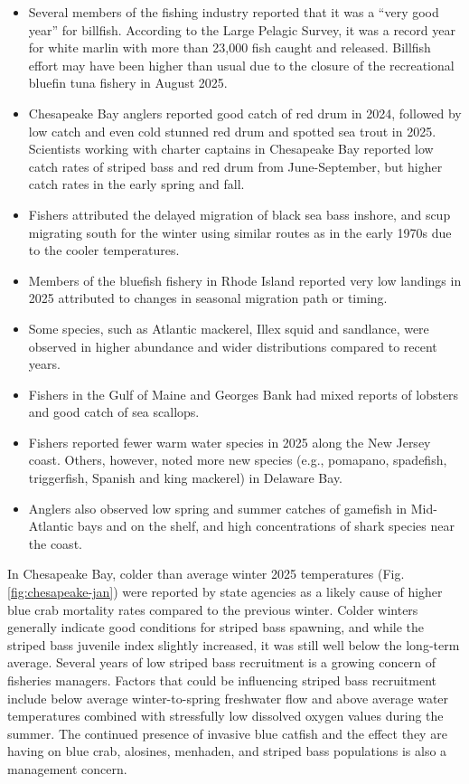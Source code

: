 \documentclass[
  10pt,
]{article}
\providecommand{\tightlist}{%
  \setlength{\itemsep}{0pt}\setlength{\parskip}{0pt}}
\begin{document}
\begin{itemize}
\tightlist
\item
  Several members of the fishing industry reported that it was a ``very good year'' for billfish. According to the Large Pelagic Survey, it was a record year for white marlin with more than 23,000 fish caught and released. Billfish effort may have been higher than usual due to the closure of the recreational bluefin tuna fishery in August 2025.
\item
  Chesapeake Bay anglers reported good catch of red drum in 2024, followed by low catch and even cold stunned red drum and spotted sea trout in 2025. Scientists working with charter captains in Chesapeake Bay reported low catch rates of striped bass and red drum from June-September, but higher catch rates in the early spring and fall.
\item
  Fishers attributed the delayed migration of black sea bass inshore, and scup migrating south for the winter using similar routes as in the early 1970s due to the cooler temperatures.
\item
  Members of the bluefish fishery in Rhode Island reported very low landings in 2025 attributed to changes in seasonal migration path or timing.
\item
  Some species, such as Atlantic mackerel, Illex squid and sandlance, were observed in higher abundance and wider distributions compared to recent years.
\item
  Fishers in the Gulf of Maine and Georges Bank had mixed reports of lobsters and good catch of sea scallops.
\item
  Fishers reported fewer warm water species in 2025 along the New Jersey coast. Others, however, noted more new species (e.g., pomapano, spadefish, triggerfish, Spanish and king mackerel) in Delaware Bay.
\item
  Anglers also observed low spring and summer catches of gamefish in Mid-Atlantic bays and on the shelf, and high concentrations of shark species near the coast.
\end{itemize}

In Chesapeake Bay, colder than average winter 2025 temperatures (Fig. \ref{fig:chesapeake-jan}) were reported by state agencies as a likely cause of higher blue crab mortality rates compared to the previous winter. Colder winters generally indicate good conditions for striped bass spawning, and while the striped bass juvenile index slightly increased, it was still well below the long-term average. Several years of low striped bass recruitment is a growing concern of fisheries managers. Factors that could be influencing striped bass recruitment include below average winter-to-spring freshwater flow and above average water temperatures combined with stressfully low dissolved oxygen values during the summer. The continued presence of invasive blue catfish and the effect they are having on blue crab, alosines, menhaden, and striped bass populations is also a management concern.
\end{document}
